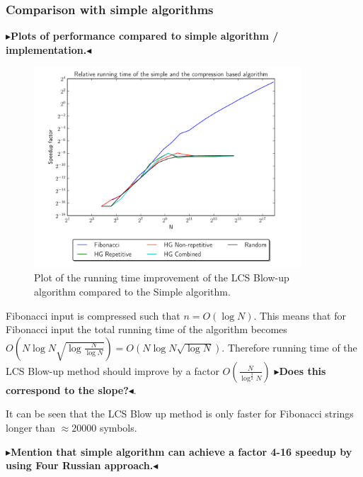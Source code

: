 \documentclass[twoside,11pt,openright]{report}
\newcommand{\todo}[1]{{\color[rgb]{.5,0,0}\textbf{$\blacktriangleright$#1$\blacktriangleleft$}}}
\begin{document}
\subsubsection{Comparison with simple algorithms}
\todo{Plots of performance compared to simple algorithm / implementation.}
\begin{figure}[h!]
  \centering
  \includegraphics[width=10cm]{combined/simple_vs_lcs}
  \caption{Plot of the running time improvement of the LCS Blow-up algorithm compared to the Simple algorithm.}
  \label{fig:benchmark:simple-vs-lcsblowup}
\end{figure}

Fibonacci input is compressed such that $n = O(\log{N})$. This means that for Fibonacci input the total running time of the algorithm becomes $O\left( N\log{N} \sqrt{\log{\frac{N}{\log{N}}}} \right) = O(N\log{N}\sqrt{\log{N}})$. Therefore running time of the LCS Blow-up method should improve by a factor $O\left( \frac{N}{\log^{\frac{3}{2}}{N}} \right)$ \todo{Does this correspond to the slope?}.

It can be seen that the LCS Blow up method is only faster for Fibonacci strings longer than $\approx 20000$ symbols.

\todo{Mention that simple algorithm can achieve a factor 4-16 speedup by using Four Russian approach.}
\end{document}

